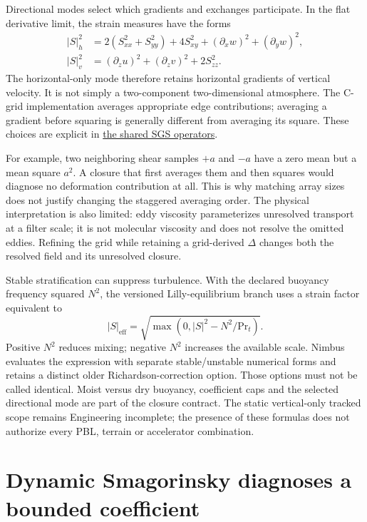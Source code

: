 Directional modes select which gradients and exchanges participate. In the
flat derivative limit, the strain measures have the forms
\[
\begin{aligned}
 |S|_h^2&=2(S_{xx}^2+S_{yy}^2)+4S_{xy}^2
                    +(\partial_xw)^2+(\partial_yw)^2,\\
 |S|_v^2&=(\partial_zu)^2+(\partial_zv)^2+2S_{zz}^2.
\end{aligned}
\]
The horizontal-only mode therefore retains horizontal gradients of vertical
velocity. It is not simply a two-component two-dimensional atmosphere.
The C-grid implementation averages appropriate edge contributions; averaging
a gradient before squaring is generally different from averaging its square.
These choices are explicit in
\href{../src/turbulence/base/eddy_viscosity.cpp}{the shared SGS operators}.

For example, two neighboring shear samples $+a$ and $-a$ have a zero mean but
a mean square $a^2$. A closure that first averages them and then squares would
diagnose no deformation contribution at all. This is why matching array sizes
does not justify changing the staggered averaging order. The physical
interpretation is also limited: eddy viscosity parameterizes unresolved
transport at a filter scale; it is not molecular viscosity and does not
resolve the omitted eddies. Refining the grid while retaining a grid-derived
$\Delta$ changes both the resolved field and its unresolved closure.

Stable stratification can suppress turbulence. With the declared buoyancy
frequency squared $N^2$, the versioned Lilly-equilibrium branch uses a strain
factor equivalent to
\[
 |S|_{\mathrm{eff}}=
 \sqrt{\max(0,|S|^2-N^2/\mathrm{Pr}_t)}.
\]
Positive $N^2$ reduces mixing; negative $N^2$ increases the available scale.
Nimbus evaluates the expression with separate stable/unstable numerical forms
and retains a distinct older Richardson-correction option. Those options must
not be called identical. Moist versus dry buoyancy, coefficient caps and the
selected directional mode are part of the closure contract. The static
vertical-only tracked scope remains Engineering incomplete; the presence of
these formulas does not authorize every PBL, terrain or accelerator combination.

\section{Dynamic Smagorinsky diagnoses a bounded coefficient}

